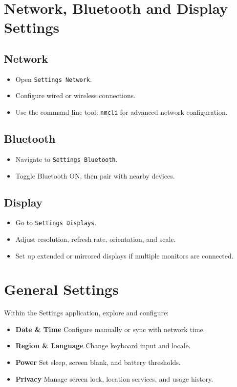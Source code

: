 \documentclass[12pt]{article}
\begin{document}
\section{Network, Bluetooth and Display Settings}

\subsection*{Network}
\begin{itemize}
    \item Open \texttt{Settings \textrightarrow{} Network}.
    \item Configure wired or wireless connections.
    \item Use the command line tool: \texttt{nmcli} for advanced network configuration.
\end{itemize}

\subsection*{Bluetooth}
\begin{itemize}
    \item Navigate to \texttt{Settings \textrightarrow{} Bluetooth}.
    \item Toggle Bluetooth ON, then pair with nearby devices.
\end{itemize}

\subsection*{Display}
\begin{itemize}
    \item Go to \texttt{Settings \textrightarrow{} Displays}.
    \item Adjust resolution, refresh rate, orientation, and scale.
    \item Set up extended or mirrored displays if multiple monitors are connected.
\end{itemize}

\section{General Settings}
Within the Settings application, explore and configure:
\begin{itemize}
    \item \textbf{Date \& Time} \textendash{} Configure manually or sync with network time.
    \item \textbf{Region \& Language} \textendash{} Change keyboard input and locale.
    \item \textbf{Power} \textendash{} Set sleep, screen blank, and battery thresholds.
    \item \textbf{Privacy} \textendash{} Manage screen lock, location services, and usage history.
\end{itemize}
\end{document}
